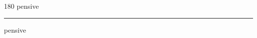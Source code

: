 
\begin{frame}
\begin{center}
\begin{turn}{180}
{\fontsize{2.5cm}{1em}\selectfont pensive}
\end{turn}
\vspace{1em}\par  
\hrule
\vspace{1em}\par  
{\fontsize{2.5cm}{1em}\selectfont pensive}
\end{center}
\end{frame}
